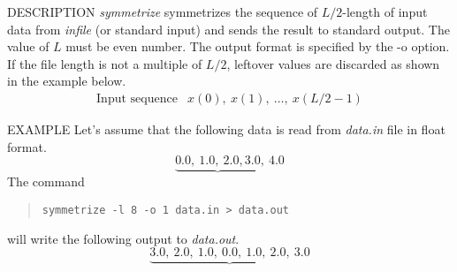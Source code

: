 \begin{synopsis}
\item[symmetrize] [ --l $L$ ] [ --o $o$ ] [ {\em infile} ]
\end{synopsis}

\begin{qsection}{DESCRIPTION}
{\em symmetrize} symmetrizes the sequence of $L/2$-length
of input data from {\em infile} (or standard input) and 
sends the result to standard output.
The value of $L$ must be even number.
The output format is specified by the -o option.
If the file length is not a multiple of $L/2$, 
leftover values are discarded as shown in the example below.
\begin{displaymath}
\begin{array}{ll}
\mbox{Input sequence} & x(0),~x(1),~\ldots,~x(L/2-1)
\end{array}
\end{displaymath}
\end{qsection}

\begin{options}
\end{options}
\begin{qsection}{EXAMPLE}
Let's assume that the following data
is read from {\em data.in} file in float format.
\begin{displaymath}
 \underbrace{0.0, ~1.0, ~2.0, 3.0}, ~4.0
\end{displaymath}
The command
\begin{quote}
\verb!symmetrize -l 8 -o 1 data.in > data.out!
\end{quote}
will write the following output to {\em data.out}.
\begin{displaymath}
 \underbrace{3.0, ~2.0, ~1.0, ~0.0, ~1.0, ~2.0, ~3.0}
\end{displaymath}
\end{qsection}

